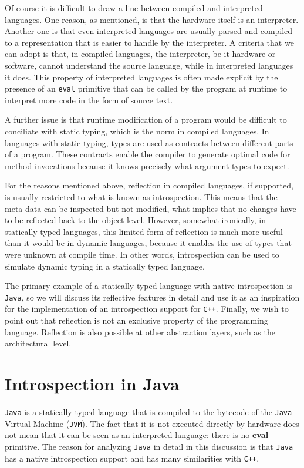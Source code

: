 Of course it is difficult to draw a line between compiled and interpreted languages. One reason, as mentioned, is that the hardware
itself is an interpreter. Another one is that even interpreted languages are usually parsed and compiled to a representation that is
easier to handle by the interpreter. A criteria that we can adopt is that, in compiled languages, the interpreter, be it hardware
or software, cannot understand the source language, while in interpreted languages it does. This property of interpreted
languages is often made explicit by the presence of an \texttt{eval} primitive that can be called by the program at runtime
to interpret more code in the form of source text.

A further issue is that runtime modification of a program would be difficult to conciliate with static typing, which is the norm
in compiled languages. In languages with static typing, types are used as contracts between different parts of a program. 
These contracts enable the compiler to generate optimal code for method invocations because it knows precisely what argument
types to expect.

For the reasons mentioned above, reflection in compiled languages, if supported, is usually restricted to what is known
as introspection. This means that the meta-data can be inspected but not modified, what implies that no changes
have to be reflected back to the object level. However, somewhat ironically, in statically typed languages, this
limited form of reflection is much more useful than it would be in dynamic languages, because it enables the use of types
that were unknown at compile time. In other words, introspection can be used to simulate dynamic typing in a statically typed language.

The primary example of a statically typed language with native introspection is \texttt{Java}, so we will discuss its reflective features in detail
and use it as an inspiration for the implementation of an introspection support for \texttt{C++}. Finally, we wish to point out that reflection
is not an exclusive property of the programming language. Reflection is also possible at other abstraction layers, such as the architectural
level.


\section{Introspection in Java}

\texttt{Java} is a statically typed language that is compiled to the bytecode of the \texttt{Java} Virtual Machine (\texttt{JVM}). The fact that it is not executed
directly by hardware does not mean that it can be seen as an interpreted language: there is no \textbf{eval} primitive.
The reason for analyzing \texttt{Java} in detail in this discussion is that \texttt{Java} has a native introspection support and has many
similarities with \texttt{C++}.

